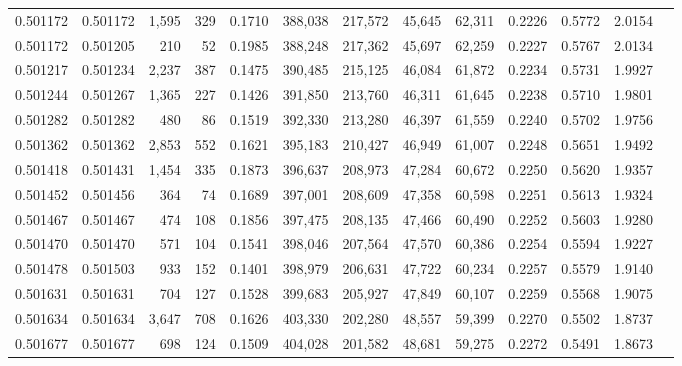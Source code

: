 \begin{tabular}{rrrrrrrrrrrrr}
0.501172 & 0.501172 & 1,595 &   329 &                                     0.1710 & 388,038 & 217,572 &  45,645 &  62,311 & 0.2226 & 0.5772 & 2.0154 \\
0.501172 & 0.501205 &   210 &    52 &                                     0.1985 & 388,248 & 217,362 &  45,697 &  62,259 & 0.2227 & 0.5767 & 2.0134 \\
0.501217 & 0.501234 & 2,237 &   387 &                                     0.1475 & 390,485 & 215,125 &  46,084 &  61,872 & 0.2234 & 0.5731 & 1.9927 \\
0.501244 & 0.501267 & 1,365 &   227 &                                     0.1426 & 391,850 & 213,760 &  46,311 &  61,645 & 0.2238 & 0.5710 & 1.9801 \\
0.501282 & 0.501282 &   480 &    86 &                                     0.1519 & 392,330 & 213,280 &  46,397 &  61,559 & 0.2240 & 0.5702 & 1.9756 \\
0.501362 & 0.501362 & 2,853 &   552 &                                     0.1621 & 395,183 & 210,427 &  46,949 &  61,007 & 0.2248 & 0.5651 & 1.9492 \\
0.501418 & 0.501431 & 1,454 &   335 &                                     0.1873 & 396,637 & 208,973 &  47,284 &  60,672 & 0.2250 & 0.5620 & 1.9357 \\
0.501452 & 0.501456 &   364 &    74 &                                     0.1689 & 397,001 & 208,609 &  47,358 &  60,598 & 0.2251 & 0.5613 & 1.9324 \\
0.501467 & 0.501467 &   474 &   108 &                                     0.1856 & 397,475 & 208,135 &  47,466 &  60,490 & 0.2252 & 0.5603 & 1.9280 \\
0.501470 & 0.501470 &   571 &   104 &                                     0.1541 & 398,046 & 207,564 &  47,570 &  60,386 & 0.2254 & 0.5594 & 1.9227 \\
0.501478 & 0.501503 &   933 &   152 &                                     0.1401 & 398,979 & 206,631 &  47,722 &  60,234 & 0.2257 & 0.5579 & 1.9140 \\
0.501631 & 0.501631 &   704 &   127 &                                     0.1528 & 399,683 & 205,927 &  47,849 &  60,107 & 0.2259 & 0.5568 & 1.9075 \\
0.501634 & 0.501634 & 3,647 &   708 &                                     0.1626 & 403,330 & 202,280 &  48,557 &  59,399 & 0.2270 & 0.5502 & 1.8737 \\
0.501677 & 0.501677 &   698 &   124 &                                     0.1509 & 404,028 & 201,582 &  48,681 &  59,275 & 0.2272 & 0.5491 & 1.8673 \\

\end{tabular}
